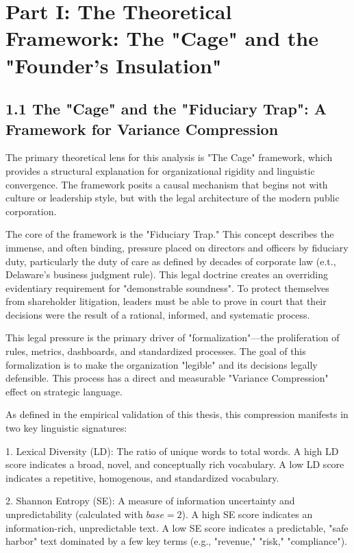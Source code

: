 \documentclass[12pt]{article}
\begin{document}
\section{Part I: The Theoretical Framework: The "Cage" and the "Founder's Insulation"}

\subsection{1.1 The "Cage" and the "Fiduciary Trap": A Framework for Variance Compression}

The primary theoretical lens for this analysis is "The Cage" framework, which provides a structural explanation for organizational rigidity and linguistic convergence. The framework posits a causal mechanism that begins not with culture or leadership style, but with the legal architecture of the modern public corporation.

The core of the framework is the "Fiduciary Trap." This concept describes the immense, and often binding, pressure placed on directors and officers by fiduciary duty, particularly the duty of care as defined by decades of corporate law (e.t., Delaware's business judgment rule). This legal doctrine creates an overriding evidentiary requirement for "demonstrable soundness". To protect themselves from shareholder litigation, leaders must be able to prove in court that their decisions were the result of a rational, informed, and systematic process.

This legal pressure is the primary driver of "formalization"—the proliferation of rules, metrics, dashboards, and standardized processes. The goal of this formalization is to make the organization "legible" and its decisions legally defensible. This process has a direct and measurable "Variance Compression" effect on strategic language.

As defined in the empirical validation of this thesis, this compression manifests in two key linguistic signatures:

1. Lexical Diversity (LD): The ratio of unique words to total words. A high LD score indicates a broad, novel, and conceptually rich vocabulary. A low LD score indicates a repetitive, homogenous, and standardized vocabulary.

2. Shannon Entropy (SE): A measure of information uncertainty and unpredictability (calculated with \(base=2\)). A high SE score indicates an information-rich, unpredictable text. A low SE score indicates a predictable, "safe harbor" text dominated by a few key terms (e.g., "revenue," "risk," "compliance").
\end{document}
